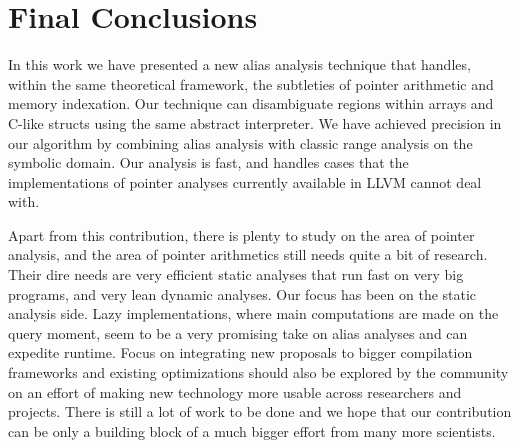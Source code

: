 \documentclass[12pt]{article}
\begin{document}
\section {Final Conclusions}
In this work we have presented a new alias analysis technique that handles,
within the same theoretical framework, the subtleties of pointer arithmetic
and memory indexation.
Our technique can disambiguate regions within arrays and C-like structs using
the same abstract interpreter.
We have achieved precision in our algorithm by combining
alias analysis with classic range analysis on the symbolic domain.
Our analysis is fast, and handles cases that the implementations of
pointer analyses currently available in LLVM cannot deal with.

Apart from this contribution, there is plenty to study on the area of 
pointer analysis, and the area of pointer arithmetics still needs quite a bit 
of research. Their dire needs are very efficient static analyses that run fast on 
very big programs, and very lean dynamic analyses. Our focus has 
been on the static analysis side. Lazy implementations, where main computations 
are made on the query moment, seem to be a very promising take on alias 
analyses and can expedite runtime. Focus on integrating new proposals to 
bigger compilation frameworks and existing optimizations should also be explored 
by the community on an effort of making new technology more usable across 
researchers and projects. There is still a lot of work to be done and we hope 
that our contribution can be only a building block of a much bigger effort from 
many more scientists.



\end{document}
